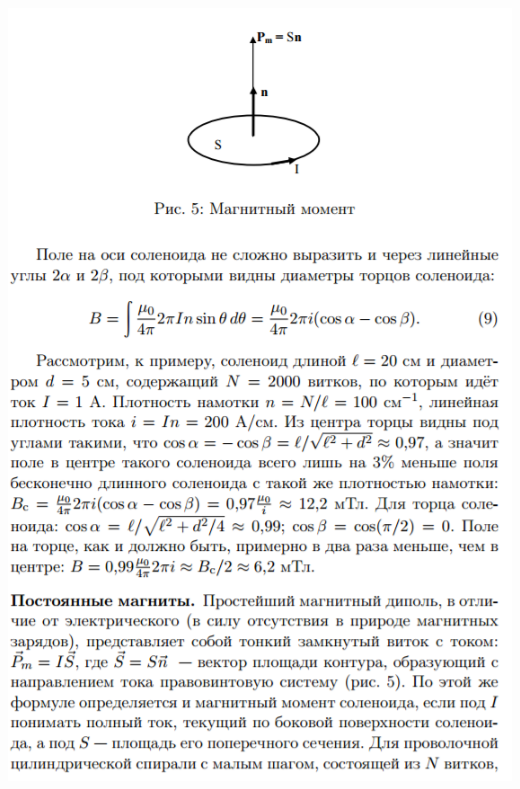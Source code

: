 \documentclass[12pt]{article}
\begin{document}
\begin{center}
	    \includegraphics[width=15cm]{theory7.png}

\end{center}
\end{document}
